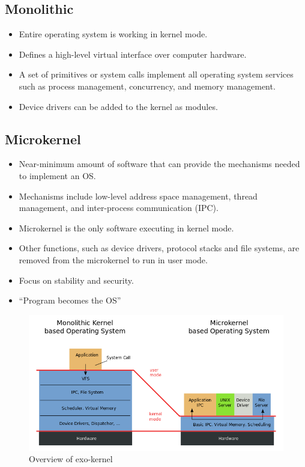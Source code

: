 
\subsection{Monolithic}
\begin{itemize}
\item Entire operating system is working in kernel mode.
\item Defines a high-level virtual interface over computer hardware.
\item A set of primitives or system calls implement all operating system services such as process management, concurrency, and memory management.
\item Device drivers can be added to the kernel as modules.
\end{itemize}

\subsection{Microkernel}
\begin{itemize}
\item Near-minimum amount of software that can provide the mechanisms needed to implement an OS.
\item Mechanisms include low-level address space management, thread management, and inter-process communication (IPC).
\item Microkernel is the only software executing in kernel mode.
\item Other functions, such as device drivers, protocol stacks and file systems, are removed from the microkernel to run in user mode.
\item Focus on stability and security.
\item ``Program becomes the OS''
\end{itemize}

\begin{figure}[H]
  \centering
  \includegraphics[scale=0.5]{images/mono-microkernel.png}
  \caption[Caption for LOF]{Overview of exo-kernel\footnotemark}
\end{figure}


